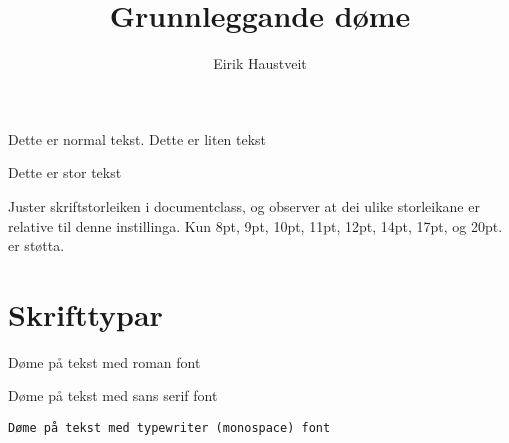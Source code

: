 \documentclass[12pt,a4paper]{extarticle}
\author{Eirik Haustveit}
\title{Grunnleggande døme}
\begin{document}
	
	\maketitle
	
	
	Dette er normal tekst. \tiny Dette er liten tekst
	
	
	\large Dette er stor tekst
	
	\normalsize
	Juster skriftstorleiken i documentclass, og observer at dei ulike storleikane er relative til denne instillinga. Kun 8pt, 9pt, 10pt, 11pt, 12pt, 14pt, 17pt, og 20pt. er støtta.
	
	\section{Skrifttypar}
	
	 \textrm{Døme på tekst med roman font}
	 
	 \textsf{Døme på tekst med sans serif font}
	 
	 \texttt{Døme på tekst med typewriter (monospace) font}
	
\end{document}
